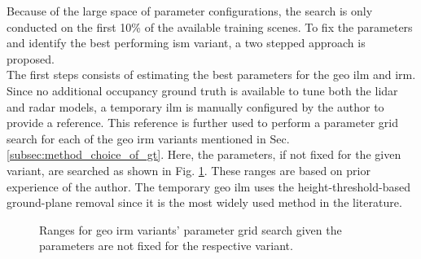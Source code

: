 Because of the large space of parameter configurations, the search is only conducted on the first 10\% of the available training scenes. To fix the parameters and identify the best performing \gls{ism} variant, a two stepped approach is proposed.
\\
The first steps consists of estimating the best parameters for the geo \gls{ilm} and \gls{irm}. Since no additional occupancy ground truth is available to tune both the lidar and radar models, a temporary \gls{ilm} is manually configured by the author to provide a reference. This reference is further used to perform a parameter grid search for each of the geo \gls{irm} variants mentioned in Sec. \ref{subsec:method_choice_of_gt}. Here, the parameters, if not fixed for the given variant, are searched as shown in Fig. \ref{tab:geo_irm_variants_gird_search_range}. These ranges are based on prior experience of the author. The temporary geo \gls{ilm} uses the height-threshold-based ground-plane removal since it is the most widely used method in the literature.
\begin{figure}
	\begin{center}
	\end{center}
	\caption{\label{tab:geo_irm_variants_gird_search_range}Ranges for geo \gls{irm} variants' parameter grid search given the parameters are not fixed for the respective variant.}
\end{figure} 

